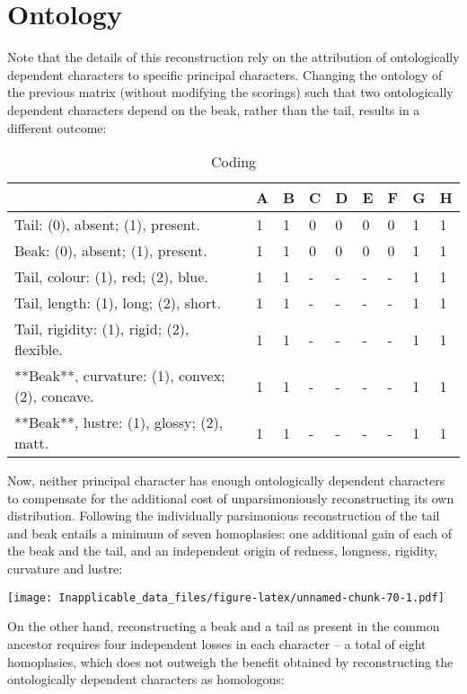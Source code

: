 \documentclass[]{book}
\theoremstyle{definition}
\theoremstyle{definition}
\theoremstyle{definition}
\theoremstyle{remark}
\begin{document}
\hypertarget{ontology}{%
\section{Ontology}\label{ontology}}

Note that the details of this reconstruction rely on the attribution of
ontologically dependent characters to specific principal characters.
Changing the ontology of the previous matrix (without modifying the
scorings) such that two ontologically dependent characters depend on the
beak, rather than the tail, results in a different outcome:

\begin{table}

\caption{\label{tab:unnamed-chunk-69}Coding}
\centering
\begin{tabular}[t]{l|l|l|l|l|l|l|l|l}
\hline
  & A & B & C & D & E & F & G & H\\
\hline
Tail: (0), absent; (1), present. & 1 & 1 & 0 & 0 & 0 & 0 & 1 & 1\\
\hline
Beak: (0), absent; (1), present. & 1 & 1 & 0 & 0 & 0 & 0 & 1 & 1\\
\hline
Tail, colour: (1), red; (2), blue. & 1 & 1 & - & - & - & - & 1 & 1\\
\hline
Tail, length: (1), long; (2), short. & 1 & 1 & - & - & - & - & 1 & 1\\
\hline
Tail, rigidity: (1), rigid; (2), flexible. & 1 & 1 & - & - & - & - & 1 & 1\\
\hline
**Beak**, curvature: (1), convex; (2), concave. & 1 & 1 & - & - & - & - & 1 & 1\\
\hline
**Beak**, lustre: (1), glossy; (2), matt. & 1 & 1 & - & - & - & - & 1 & 1\\
\hline
\end{tabular}
\end{table}

Now, neither principal character has enough ontologically dependent
characters to compensate for the additional cost of unparsimoniously
reconstructing its own distribution. Following the individually
parsimonious reconstruction of the tail and beak entails a minimum of
seven homoplasies: one additional gain of each of the beak and the tail,
and an independent origin of redness, longness, rigidity, curvature and
lustre:

\texttt{[image: Inapplicable\_data\_files/figure-latex/unnamed-chunk-70-1.pdf]}

On the other hand, reconstructing a beak and a tail as present in the
common ancestor requires four independent losses in each character -- a
total of eight homoplasies, which does not outweigh the benefit obtained
by reconstructing the ontologically dependent characters as homologous:
\end{document}
